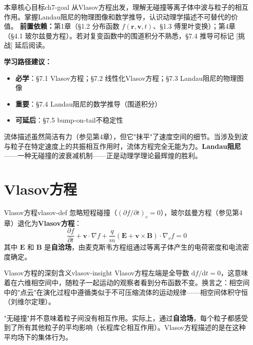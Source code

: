 \documentclass[12pt,a4paper,openany,oneside]{book}
\newcommand{\diff}{\mathrm{d}}
\newcommand{\vect}[1]{\bm{#1}}
\newcommand{\grad}{\nabla}
\newcommand{\difficulty}[1]{\marginnote{\hfill\textcolor{coverMid!80}{\rule[-0.1em]{2pt}{0.9em}}\,\textcolor{coverMid}{\footnotesize\textbf{[#1]}}}}
\begin{document}
\begin{insight}{本章核心目标}{ch7-goal}
从Vlasov方程出发，理解无碰撞等离子体中波与粒子的相互作用。掌握Landau阻尼的物理图像和数学推导，认识动理学描述不可替代的价值。
\tcblower
\textbf{前置依赖：}第1章（\S1.2 分布函数 $f(\vect{r},\vect{v},t)$、\S1.3 傅里叶变换）；第4章（\S4.1 玻尔兹曼方程）。若对复变函数中的围道积分不熟悉，\S7.4 推导可标记 [挑战] 延后阅读。

\textbf{学习路径建议：}

\begin{itemize}[leftmargin=*]
\item[\textcolor{red}{$\blacksquare$}] \textbf{必学}：\S7.1 Vlasov方程；\S7.2 线性化Vlasov方程；\S7.3 Landau阻尼的物理图像
\item[\textcolor{orange}{$\blacksquare$}] \textbf{重要}：\S7.4 Landau阻尼的数学推导（围道积分）
\item[\textcolor{green}{$\blacksquare$}] \textbf{可延后}：\S7.5  bump-on-tail不稳定性
\end{itemize}
\end{insight}

流体描述虽然简洁有力（参见第4章），但它"抹平"了速度空间的细节。当涉及到波与粒子在特定速度上的共振相互作用时，流体方程完全无能为力。\textbf{Landau阻尼}——一种无碰撞的波衰减机制——正是动理学理论最辉煌的胜利。

\section{Vlasov方程}\difficulty{基础}

\begin{definition}{Vlasov方程}{vlasov-def}
忽略短程碰撞（$(\partial f/\partial t)_c = 0$），玻尔兹曼方程（参见第4章）退化为\textbf{Vlasov方程}：
\[
\frac{\partial f}{\partial t} + \vect{v}\cdot\grad f + \frac{q}{m}(\vect{E} + \vect{v}\times\vect{B})\cdot\grad_v f = 0
\]
其中 $\vect{E}$ 和 $\vect{B}$ 是\textbf{自洽场}，由麦克斯韦方程组通过等离子体产生的电荷密度和电流密度确定。
\end{definition}

\begin{insight}{Vlasov方程的深刻含义}{vlasov-insight}
Vlasov方程左端是全导数 $\diff f/\diff t = 0$，这意味着在六维相空间中，随粒子一起运动的观察者看到分布函数不变。换言之：相空间中的"点云"在演化过程中遵循类似于不可压缩流体的运动规律——相空间体积守恒（刘维尔定理）。

"无碰撞"并不意味着粒子间没有相互作用。实际上，通过\textbf{自洽场}，每个粒子都感受到了所有其他粒子的平均影响（长程库仑相互作用）。Vlasov方程描述的是在这种平均场下的集体行为。
\end{insight}
\end{document}
